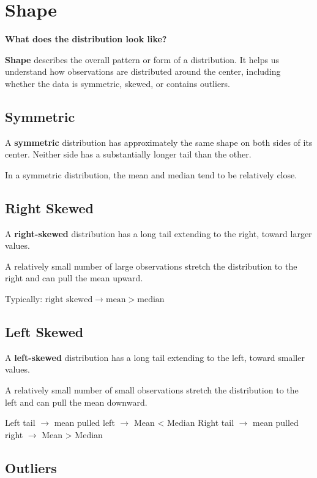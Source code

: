 \documentclass[
  letterpaper,
  DIV=11,
  numbers=noendperiod]{scrreprt}
\begin{document}
\section{Shape}\label{shape}

\textbf{What does the distribution look like?}

\textbf{Shape} describes the overall pattern or form of a distribution.
It helps us understand how observations are distributed around the
center, including whether the data is symmetric, skewed, or contains
outliers.

\subsection{Symmetric}\label{symmetric}

A \textbf{symmetric} distribution has approximately the same shape on
both sides of its center. Neither side has a substantially longer tail
than the other.

In a symmetric distribution, the mean and median tend to be relatively
close.

\subsection{Right Skewed}\label{right-skewed}

A \textbf{right-skewed} distribution has a long tail extending to the
right, toward larger values.

A relatively small number of large observations stretch the distribution
to the right and can pull the mean upward.

Typically: \(\text{right skewed} \rightarrow \text{mean}>\text{median}\)

\subsection{Left Skewed}\label{left-skewed}

A \textbf{left-skewed} distribution has a long tail extending to the
left, toward smaller values.

A relatively small number of small observations stretch the distribution
to the left and can pull the mean downward.

Left tail \(\rightarrow\) mean pulled left \(\rightarrow\) Mean
\textless{} Median Right tail \(\rightarrow\) mean pulled right
\(\rightarrow\) Mean \textgreater{} Median

\subsection{Outliers}\label{outliers}
\end{document}
